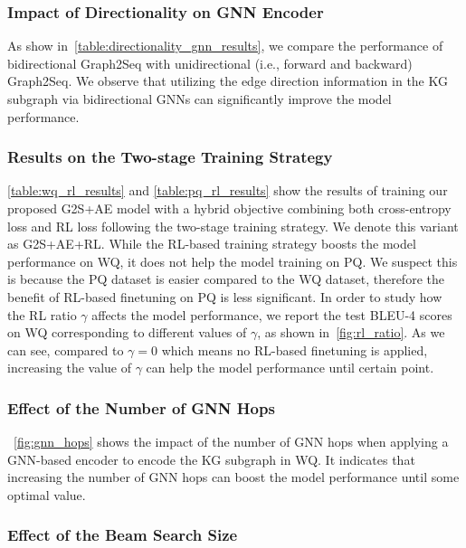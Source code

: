 \documentclass[journal]{IEEEtran}
\begin{document}
\subsubsection{Impact of Directionality on GNN Encoder}
As show in~\cref{table:directionality_gnn_results},
we compare the performance of bidirectional Graph2Seq with unidirectional 
(i.e., forward and backward) 
Graph2Seq.
We observe that utilizing the edge direction information in the KG subgraph via bidirectional GNNs can significantly improve the model performance.







\subsubsection{Results on the Two-stage Training Strategy}
\cref{table:wq_rl_results} and \cref{table:pq_rl_results} show the results of training our proposed G2S+AE model with a hybrid objective combining both cross-entropy loss and RL loss following the two-stage training strategy. We denote this variant as G2S+AE+RL.
While the RL-based training strategy boosts the model performance on WQ, it does not help the model training on PQ.
We suspect this is because the PQ dataset is easier compared to the WQ dataset, therefore the benefit of RL-based finetuning on PQ is less significant. 
In order to study how the RL ratio $\gamma$ affects the model performance, we report the test BLEU-4 scores on WQ corresponding to different values of $\gamma$, as shown in~\cref{fig:rl_ratio}. As we can see, compared to $\gamma = 0$ which means no RL-based finetuning is applied, increasing the value of $\gamma$ can help the model performance until certain point.



 

\subsubsection{Effect of the Number of GNN Hops}
~\cref{fig:gnn_hops} shows the impact of the number of GNN hops when applying a GNN-based encoder to encode the KG subgraph in WQ.
It indicates that increasing the number of GNN hops can boost the model performance until some optimal value.


\subsubsection{Effect of the Beam Search Size}
\end{document}
